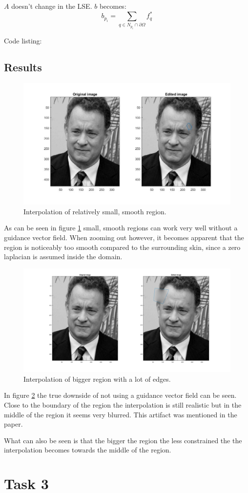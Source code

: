 \documentclass[]{book}
\theoremstyle{definition}
\begin{document}
$A$ doesn't change in the LSE. $b$ becomes:
\begin{equation}
b_{p_i} = \sum_{q\in N_{p_i}\cap \partial \Omega} f_q^*
\end{equation}

Code listing:



\subsection*{Results}
\begin{figure}[H]
\centering{}\includegraphics[width=13cm]{images/ex2_smooth.jpg}\caption{Interpolation of relatively small, smooth region.\label{ex2_smooth}}
\end{figure}
As can be seen in figure \ref{ex2_smooth} small, smooth regions can work very well without a guidance vector field. When zooming out however, it becomes apparent that the region is noticeably too smooth compared to the surrounding skin, since a zero laplacian is assumed inside the domain.

\begin{figure}[H]
\centering{}\includegraphics[width=13cm]{images/ex2_edges_big_region.jpg}\caption{Interpolation of bigger region with a lot of edges. \label{ex2_edges_big_region}}
\end{figure}
In figure \ref{ex2_edges_big_region} the true downside of not using a guidance vector field can be seen. Close to the boundary of the region the interpolation is still realistic but in the middle of the region it seems very blurred. This artifact was mentioned in the paper.

What can also be seen is that the bigger the region the less constrained the the interpolation becomes towards the middle of the region.

\section*{Task 3}
\end{document}
